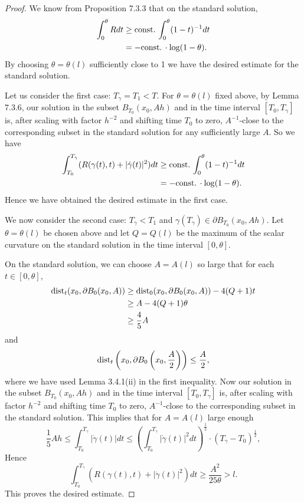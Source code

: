 \begin{proof}
We know from Proposition 7.3.3 that on the standard solution,
\begin{align*}
\int^{\theta}_{0}Rdt
&  \geq{\rm  const.}\,\int^{\theta}_0(1-t)^{-1}dt\\
&  = -{\rm  const.}\,\cdot\log(1-\theta).
\end{align*}
By choosing $\theta=\theta(l)$ sufficiently close to 1 we have the
desired estimate for the standard solution.

Let us consider the first case: $T_{\gamma}=T_1<T$. For
$\theta=\theta(l)$ fixed above, by Lemma 7.3.6, our solution in
the subset $B_{T_0}(x_0,Ah)$ and in the time interval
$[T_0,T_{\gamma}]$ is, after scaling with factor $h^{-2}$ and
shifting time $T_0$ to zero, $A^{-1}$-close to the corresponding
subset in the standard solution for any sufficiently large $A$. So
we have
\begin{align*}
\int^{T_{\gamma}}_{T_0}(R(\gamma(t),t) + |\dot{\gamma}(t)|^2)dt
&  \geq {\rm const.}\,\int^{\theta}_0(1-t)^{-1}dt\\
&  = -{\rm const.}\,\cdot\log(1-\theta).
\end{align*}
Hence we have obtained the desired estimate in the first case.

We now consider the second case: $T_{\gamma}<T_1$ and
$\gamma(T_{\gamma})\in \partial B_{T_0}(x_0,Ah)$. Let
$\theta=\theta(l)$ be chosen above and let $Q=Q(l)$ be the maximum
of the scalar curvature on the standard solution in the time
interval $[0,\theta]$.

On the standard solution, we can choose $A=A(l)$ so large that for
each $t\in[0,\theta]$,
\begin{align*}
{\rm dist}_t(x_0,\partial B_0(x_0,A))
&  \geq {\rm dist}_0(x_0,\partial B_0(x_0,A))-4(Q+1)t\\
&  \geq A-4(Q+1)\theta\\
&  \geq \frac{4}{5}A
\end{align*}
and
$$
{\rm dist}_t\left(x_0,\partial
B_0\left(x_0,\frac{A}{2}\right)\right)\leq\frac{A}{2},
$$
where we have used Lemma 3.4.1(ii) in the first inequality. Now
our solution in the subset $B_{T_0}(x_0,Ah)$ and in the time
interval $[T_0,T_{\gamma}]$ is, after scaling with factor $h^{-2}$
and shifting time $T_0$ to zero, $A^{-1}$-close to the
corresponding subset in the standard solution. This implies that
for $A=A(l)$ large enough
$$
\frac{1}{5}Ah\leq\int^{T_{\gamma}}_{T_0}|\dot{\gamma}(t)|dt
\leq\left(\int^{T_{\gamma}}_{T_0}|
\dot{\gamma}(t)|^2dt\right)^{\frac{1}{2}}\cdot(T_{\gamma}-T_0)^{\frac{1}{2}},
$$
Hence
$$
\int^{T_{\gamma}}_{T_0}(R(\gamma(t),t) +
|\dot{\gamma}(t)|^2)dt\geq \frac{A^2}{25\theta}>l.
$$
This proves the desired estimate.
\end{proof}


